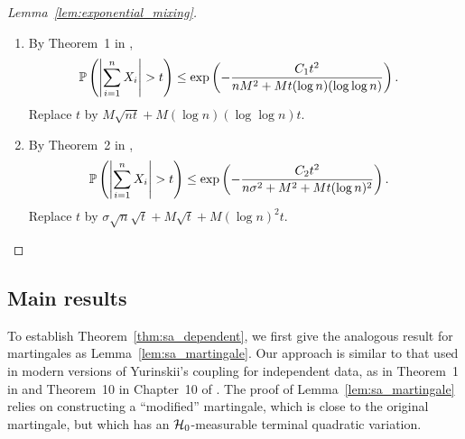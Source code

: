 \begin{proof}[Lemma~\ref{lem:exponential_mixing}]

  \begin{enumerate}[label=(\roman*)]

    \item
      By Theorem~1 in \citet{merlevede2009bernstein},
      \begin{align*}
        \P\left(
          \left|
          \sum_{i=1}^n
          X_i
          \right|
          > t
        \right)
        &\leq
        \exp\left(
          -\frac{C_1 t^2}{n M^2 + Mt (\log n)(\log\log n)}
        \right).
      \end{align*}
      Replace $t$ by
      $M \sqrt{n t} + M (\log n)(\log \log n) t$.

    \item
      By Theorem~2 in \citet{merlevede2009bernstein},
      \begin{align*}
        \P\left(
          \left|
          \sum_{i=1}^n
          X_i
          \right|
          > t
        \right)
        &\leq
        \exp\left(
          -\frac{C_2 t^2}{n\sigma^2 + M^2 + Mt (\log n)^2}
        \right).
      \end{align*}
      Replace $t$ by
      $\sigma \sqrt n \sqrt t + M \sqrt t + M (\log n)^2 t$.
  \end{enumerate}
\end{proof}

\subsection{Main results}

To establish Theorem~\ref{thm:sa_dependent}, we first
give the analogous result
for martingales as Lemma~\ref{lem:sa_martingale}. Our approach is similar to
that used in modern versions of Yurinskii's coupling for independent data, as
in Theorem~1 in \citet{lecam1988} and Theorem~10 in Chapter~10 of
\citet{pollard2002user}. The proof of Lemma~\ref{lem:sa_martingale} relies on
constructing a ``modified'' martingale, which is close to the original
martingale, but which has an $\cH_0$-measurable terminal quadratic variation.

